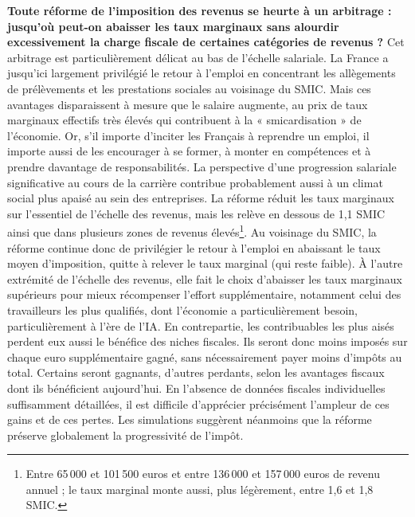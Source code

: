 \documentclass[10pt,a4paper]{article}
\begin{document}
\textbf{Toute réforme de l’imposition des revenus se heurte à un arbitrage : jusqu’où peut-on abaisser les taux marginaux sans alourdir excessivement la charge fiscale de certaines catégories de revenus ?} Cet arbitrage est particulièrement délicat au bas de l’échelle salariale. La France a jusqu’ici largement privilégié le retour à l’emploi en concentrant les allègements de prélèvements et les prestations sociales au voisinage du SMIC. Mais ces avantages disparaissent à mesure que le salaire augmente, au prix de taux marginaux effectifs très élevés qui contribuent à la « smicardisation » de l’économie. Or, s’il importe d’inciter les Français à reprendre un emploi, il importe aussi de les encourager à se former, à monter en compétences et à prendre davantage de responsabilités. La perspective d’une progression salariale significative au cours de la carrière contribue probablement aussi à un climat social plus apaisé au sein des entreprises. La réforme réduit les taux marginaux sur l’essentiel de l’échelle des revenus, mais les relève en dessous de 1,1 SMIC ainsi que dans plusieurs zones de revenus élevés\footnote{Entre 65\,000 et 101\,500 euros et entre 136\,000 et 157\,000 euros de revenu annuel ; le taux marginal monte aussi, plus légèrement, entre 1,6 et 1,8 SMIC.}. Au voisinage du SMIC, la réforme continue donc de privilégier le retour à l’emploi en abaissant le taux moyen d’imposition, quitte à relever le taux marginal (qui reste faible). À l’autre extrémité de l’échelle des revenus, elle fait le choix d’abaisser les taux marginaux supérieurs pour mieux récompenser l’effort supplémentaire, notamment celui des travailleurs les plus qualifiés, dont l’économie a particulièrement besoin, particulièrement à l'ère de l'IA. En contrepartie, les contribuables les plus aisés perdent eux aussi le bénéfice des niches fiscales. Ils seront donc moins imposés sur chaque euro supplémentaire gagné, sans nécessairement payer moins d’impôts au total. Certains seront gagnants, d’autres perdants, selon les avantages fiscaux dont ils bénéficient aujourd’hui. En l’absence de données fiscales individuelles suffisamment détaillées, il est difficile d’apprécier précisément l’ampleur de ces gains et de ces pertes. Les simulations suggèrent néanmoins que la réforme préserve globalement la progressivité de l’impôt.
\end{document}
